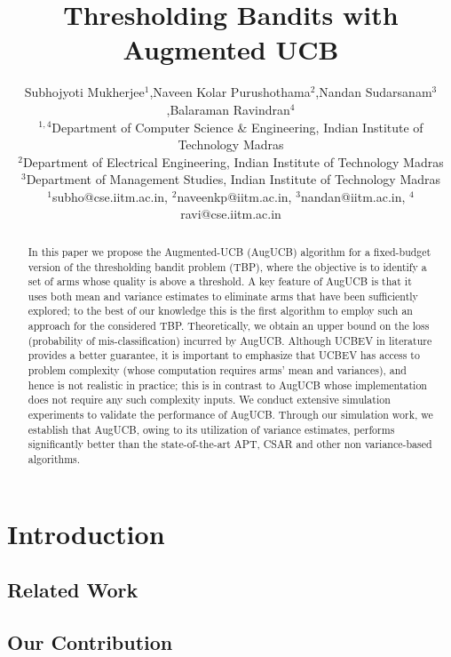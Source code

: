 \documentclass{article}
\title{Thresholding Bandits with Augmented UCB}
\author{\Large Subhojyoti Mukherjee${}^1$,Naveen Kolar Purushothama${}^2$,Nandan
Sudarsanam${}^3$,Balaraman Ravindran${}^4$ \\
\Large ${}^{1,4}$Department of Computer Science \& Engineering, Indian Institute of
Technology Madras\\ 
\Large ${}^2$Department of Electrical Engineering, Indian Institute of
Technology Madras\\
\Large ${}^3$Department of Management Studies, Indian Institute of
Technology Madras
\\
\Large ${}^{1}$subho@cse.iitm.ac.in, ${}^{2}$naveenkp@iitm.ac.in, ${}^{3}$nandan@iitm.ac.in, ${}^{4}$ravi@cse.iitm.ac.in
}
\begin{document}
\maketitle


\vspace*{2mm}
\begin{abstract}
In this paper we propose the Augmented-UCB (AugUCB) algorithm for a fixed-budget version of the thresholding bandit problem (TBP), where the objective is to identify a set of arms whose quality is above a threshold. A key feature of AugUCB is that it uses both mean and variance estimates to eliminate arms that have been sufficiently explored; to the best of our knowledge this is the first algorithm to employ such an approach for the considered TBP.  Theoretically, we obtain an upper bound on the loss (probability of mis-classification) incurred by AugUCB. Although UCBEV in literature provides a better guarantee, it is important to emphasize that UCBEV has access to problem complexity (whose computation requires arms' mean and variances), and hence is not realistic in practice; this is in contrast to AugUCB whose implementation does not require any such complexity inputs. We conduct extensive simulation experiments to validate the performance of AugUCB. Through our simulation work, we establish that AugUCB, owing to its utilization of variance estimates, performs significantly better than the state-of-the-art APT, CSAR and other non variance-based algorithms.
\end{abstract}


\section{Introduction}
\label{intro}





\subsection{Related Work}
\label{prevRes}


\subsection{Our Contribution}
\label{contribution}

%
%
%
%
\vspace*{-1em}
\end{document}

